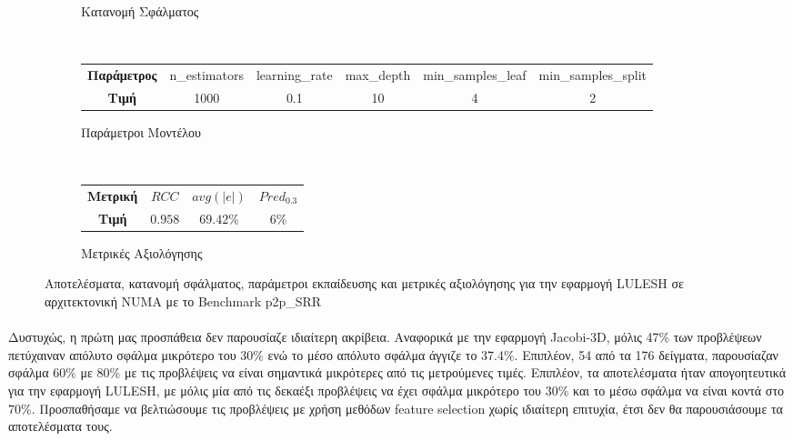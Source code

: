 \begin{figure}
\begin{subfigure}[b]{0.47\textwidth}
        \caption{Κατανομή Σφάλματος}
    \end{subfigure} 
    \\[0.2cm]
    \begin{subfigure}[b]{\textwidth}
   	 	\scriptsize
		\begin{tabular}{c||c|c|c|c|c}
			\textbf{Παράμετρος} & n\_estimators & learning\_rate & max\_depth & min\_samples\_leaf & min\_samples\_split \\
			\textbf{Τιμή}       &       1000        &  0.1               & 10          &  4                  &    2
		\end{tabular}
		\caption{Παράμετροι Μοντέλου}
    \end{subfigure}
    \\[0.2cm]
    \begin{subfigure}[b]{\textwidth}
    		\centering
   	 	\scriptsize
		\begin{tabular}{c||c|c|c}
			\textbf{Μετρική} & $RCC$ &   $avg(|e|)$ & $Pred_{0.3}$  \\
			\textbf{Τιμή}  &  $0.958$   &      $69.42\%
			$        &  $6\%$                                         
		\end{tabular}
		\caption{Μετρικές Αξιολόγησης}
    \end{subfigure}
    
        \caption{Αποτελέσματα, κατανομή σφάλματος, παράμετροι εκπαίδευσης και μετρικές αξιολόγησης για την εφαρμογή LULESH σε αρχιτεκτονική NUMA με το Benchmark p2p\_SRR}
    \label{fig:NB_lulesh_NUMA}
\end{figure}
\paragraph{}
Δυστυχώς, η πρώτη μας προσπάθεια δεν παρουσίαζε ιδιαίτερη ακρίβεια. Αναφορικά με την εφαρμογή Jacobi-3D, μόλις 47\% των προβλέψεων πετύχαιναν απόλυτο σφάλμα μικρότερο του 30\% ενώ το μέσο απόλυτο σφάλμα άγγιζε το 37.4\%. Επιπλέον, 54 από τα 176 δείγματα, παρουσίαζαν σφάλμα 60\% με 80\% με τις προβλέψεις να είναι σημαντικά μικρότερες από τις μετρούμενες τιμές. Επιπλέον, τα αποτελέσματα ήταν απογοητευτικά για την εφαρμογή LULESH, με μόλις μία από τις δεκαέξι προβλέψεις να έχει σφάλμα μικρότερο του 30\% και το μέσω σφάλμα να είναι κοντά στο 70\%. Προσπαθήσαμε να βελτιώσουμε τις προβλέψεις με χρήση μεθόδων feature selection χωρίς ιδιαίτερη επιτυχία, έτσι δεν θα παρουσιάσουμε τα αποτελέσματα τους.

